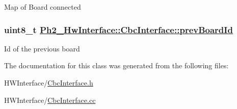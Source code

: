 Map of Board connected \hypertarget{class_ph2___hw_interface_1_1_cbc_interface_d4c28eff1e453e9954445f9fe02c16b6}{
\subsubsection[prevBoardId]{\setlength{\rightskip}{0pt plus 5cm}uint8\_\-t \hyperlink{class_ph2___hw_interface_1_1_cbc_interface_d4c28eff1e453e9954445f9fe02c16b6}{Ph2\_\-Hw\-Interface::Cbc\-Interface::prev\-Board\-Id}}}
\label{class_ph2___hw_interface_1_1_cbc_interface_d4c28eff1e453e9954445f9fe02c16b6}


Id of the previous board 

The documentation for this class was generated from the following files:\begin{CompactItemize}
\item 
HWInterface/\hyperlink{_cbc_interface_8h}{Cbc\-Interface.h}\item 
HWInterface/\hyperlink{_cbc_interface_8cc}{Cbc\-Interface.cc}\end{CompactItemize}
